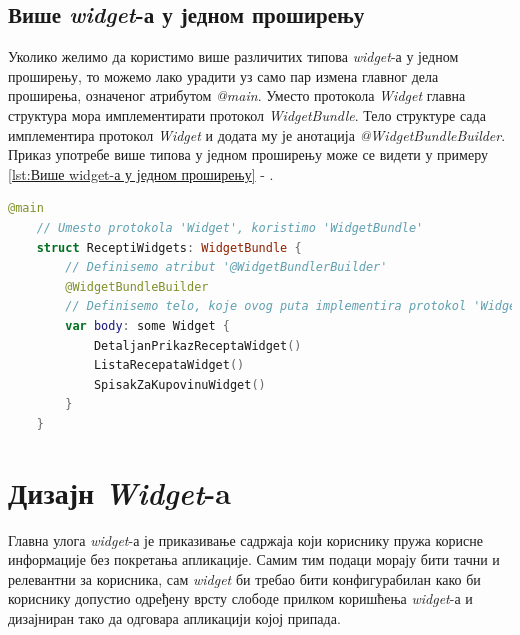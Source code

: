 \documentclass[12pt,oneside]{memoir}
\begin{document}
\subsection{Више \textit{widget}-а у једном проширењу}
\indent Уколико желимо да користимо више различитих типова \textit{widget}-а у једном проширењу, то можемо лако урадити уз само пар измена главног дела проширења, означеног атрибутом \textit{@main}. Уместо протокола \textit{Widget} главна структура мора имплементирати протокол \textit{WidgetBundle}. Тело структуре сада имплементира протокол \textit{Widget} и додата му је анотација \textit{@WidgetBundleBuilder}. Приказ употребе више типова у једном проширењу може се видети у примеру \ref{lst:Више widget-а у једном проширењу} - .

\begin{lstlisting}[caption=\textit{{Више widget-а у једном проширењу}}, label={lst:Више widget-а у једном проширењу}, language=Swift, frame=single]
    @main
    // Umesto protokola 'Widget', koristimo 'WidgetBundle'
    struct ReceptiWidgets: WidgetBundle {
        // Definisemo atribut '@WidgetBundlerBuilder'
        @WidgetBundleBuilder
        // Definisemo telo, koje ovog puta implementira protokol 'Widget'
        var body: some Widget {
            DetaljanPrikazReceptaWidget()
            ListaRecepataWidget()
            SpisakZaKupovinuWidget()
        }
    }
\end{lstlisting}

\section{Дизајн \textit{Widget}-a}
\label{sec:Дизајн Widget-a}

\indent Главна улога \textit{widget}-а је приказивање садржаја који кориснику пружа корисне информације без покретања апликације. Самим тим подаци морају бити тачни и релевантни за корисника, сам \textit{widget} би требао бити конфигурабилан како би кориснику допустио одређену врсту слободе прилком коришћења \textit{widget}-а и дизајниран тако да одговара апликацији којој припада.
\end{document}
